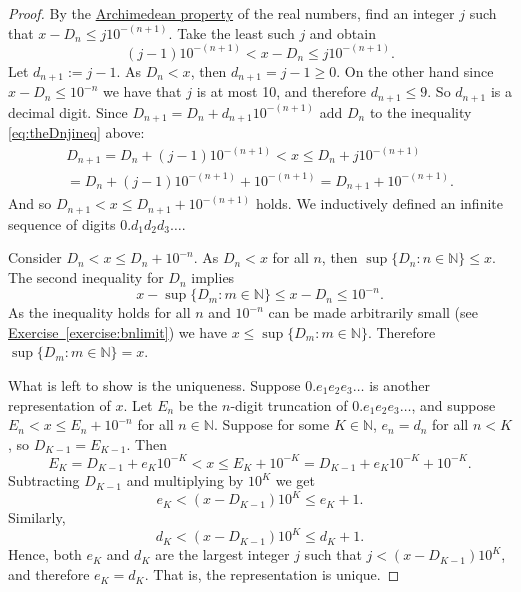 \documentclass[12pt]{book}
\newcommand{\N}{{\mathbb{N}}}
\theoremstyle{plain}
\theoremstyle{remark}
\theoremstyle{definition}
\theoremstyle{exercise}
\theoremstyle{example}
\newcommand{\exerciseref}[1]{\hyperref[#1]{Exercise~\ref*{#1}}}
\begin{document}
\begin{proof}
By the 
\hyperref[thm:arch:i]{Archimedean property} of the real numbers,
find an integer $j$ such that
$x-D_n \leq j {10}^{-(n+1)}$.  Take the least such $j$ and obtain 
\begin{equation} \label{eq:theDnjineq}
(j-1){10}^{-(n+1)} < x-D_n \leq j {10}^{-(n+1)} .
\end{equation}
Let $d_{n+1} := j-1$.
As $D_n < x$,
then $d_{n+1} = j-1 \geq 0$.  On the other hand since
$x-D_n \leq {10}^{-n}$ we have that
$j$ is at most 10, and therefore $d_{n+1} \leq 9$.
So $d_{n+1}$ is a
decimal digit.
Since $D_{n+1} = D_n + d_{n+1} {10}^{-(n+1)}$
add $D_n$ to the inequality
\eqref{eq:theDnjineq} above:
\begin{multline*}
D_{n+1} = D_n + (j-1){10}^{-(n+1)} < x
\leq
D_n + j {10}^{-(n+1)} \\
=
D_n + (j-1) {10}^{-(n+1)} +
{10}^{-(n+1)} = D_{n+1} + {10}^{-(n+1)} .
\end{multline*}
And so
$D_{n+1} < x \leq D_{n+1} + {10}^{-(n+1)}$ holds.
We inductively
defined an infinite sequence of digits $0.d_1d_2d_3\ldots$.

Consider $D_{n} < x \leq D_{n} + {10}^{-n}$.
As $D_n < x$ for all $n$, then
$\sup \{ D_n : n \in \N \} \leq x$.
The second inequality for $D_n$ implies
\begin{equation*}
x - \sup \{ D_m : m \in \N \}
\leq
x - D_n \leq 10^{-n} .
\end{equation*}
As the inequality holds for all $n$ and
${10}^{-n}$ can be made arbitrarily small (see
\exerciseref{exercise:bnlimit}) we have $x \leq 
\sup \{ D_m : m \in \N \}$.
Therefore
$\sup \{ D_m : m \in \N \} = x$.

What is left to show is the uniqueness.
Suppose $0.e_1e_2e_3\ldots$ is another representation of $x$.
Let $E_n$ be the $n$-digit truncation of $0.e_1e_2e_3\ldots$, and suppose
$E_n < x \leq E_n + {10}^{-n}$ for all $n \in \N$.
Suppose for some $K \in \N$, $e_n = d_n$ for all $n < K$, so
$D_{K-1} = E_{K-1}$.  Then
\begin{equation*}
E_K = D_{K-1} + e_K{10}^{-K} < x \leq E_K + {10}^{-K} = D_{K-1} +
e_K{10}^{-K} + {10}^{-K} .
\end{equation*}
Subtracting $D_{K-1}$ and multiplying by ${10}^{K}$ we get
\begin{equation*}
e_K < (x - D_{K-1}){10}^K \leq e_K + 1 .
\end{equation*}
Similarly,
\begin{equation*}
d_K < (x - D_{K-1}){10}^K \leq d_K + 1 .
\end{equation*}
Hence, both $e_K$ and $d_K$ are the largest integer $j$
such that $j < (x - D_{K-1}){10}^K$, and therefore $e_K = d_K$.  That is,
the representation is unique.
\end{proof}
\end{document}
